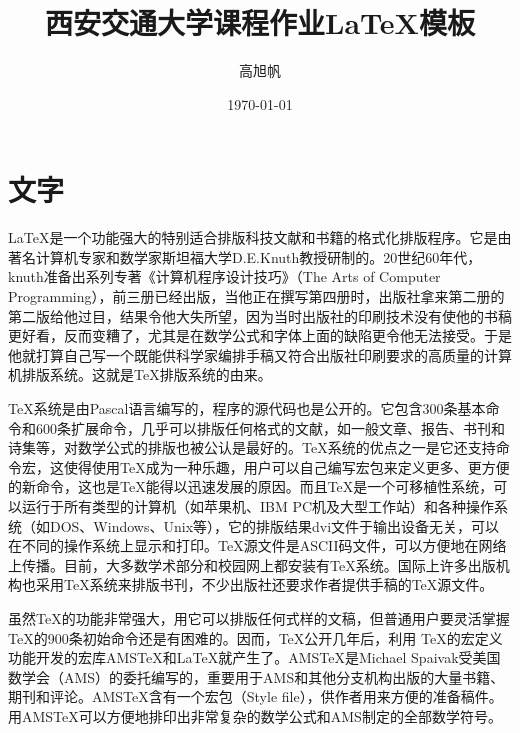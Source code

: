 \documentclass[UTF8,12pt,a4paper]{article}
\title{西安交通大学课程作业\LaTeX 模板}%
\author{高旭帆}  %
\date{\today}
\begin{document}






\section{文字}
\LaTeX 是一个功能强大的特别适合排版科技文献和书籍的格式化排版程序。它是由著名计算机专家和数学家斯坦福大学D.E.Knuth教授研制的。20世纪60年代，knuth准备出系列专著《计算机程序设计技巧》（The Arts of Computer Programming），前三册已经出版，当他正在撰写第四册时，出版社拿来第二册的第二版给他过目，结果令他大失所望，因为当时出版社的印刷技术没有使他的书稿更好看，反而变糟了，尤其是在数学公式和字体上面的缺陷更令他无法接受。于是他就打算自己写一个既能供科学家编排手稿又符合出版社印刷要求的高质量的计算机排版系统。这就是TeX排版系统的由来。

TeX系统是由Pascal语言编写的，程序的源代码也是公开的。它包含300条基本命令和600条扩展命令，几乎可以排版任何格式的文献，如一般文章、报告、书刊和诗集等，对数学公式的排版也被公认是最好的。TeX系统的优点之一是它还支持命令宏，这使得使用TeX成为一种乐趣，用户可以自己编写宏包来定义更多、更方便的新命令，这也是TeX能得以迅速发展的原因。而且TeX是一个可移植性系统，可以运行于所有类型的计算机（如苹果机、IBM PC机及大型工作站）和各种操作系统（如DOS、Windows、Unix等），它的排版结果dvi文件于输出设备无关，可以在不同的操作系统上显示和打印。TeX源文件是ASCII码文件，可以方便地在网络上传播。目前，大多数学术部分和校园网上都安装有TeX系统。国际上许多出版机构也采用TeX系统来排版书刊，不少出版社还要求作者提供手稿的TeX源文件。

虽然TeX的功能非常强大，用它可以排版任何式样的文稿，但普通用户要灵活掌握TeX的900条初始命令还是有困难的。因而，TeX公开几年后，利用 TeX的宏定义功能开发的宏库AMSTeX和LaTeX就产生了。AMSTeX是Michael Spaivak受美国数学会（AMS）的委托编写的，重要用于AMS和其他分支机构出版的大量书籍、期刊和评论。AMSTeX含有一个宏包（Style file），供作者用来方便的准备稿件。用AMSTeX可以方便地排印出非常复杂的数学公式和AMS制定的全部数学符号。
\end{document}
